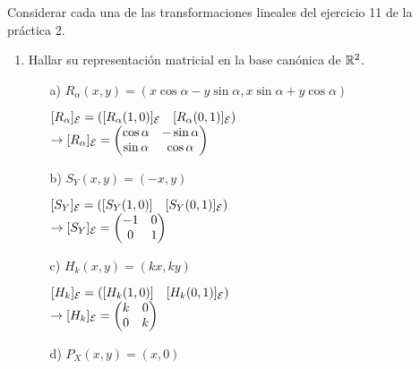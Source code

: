 \item Considerar cada una de las transformaciones lineales del ejercicio 11 de la práctica 2.
    \begin{enumerate}
        \item Hallar su representación matricial en la base canónica de $\mathbb{R}^2$.
            \begin{mdframed}[style=s]
                \begin{enumerate}
                    \item[a)] $R_\alpha(x,y)=(x\cos\alpha-y\sin\alpha,x\sin\alpha+y\cos\alpha)$
                        \begin{center}
                            $[R_\alpha]_{\mathcal{E}}=\left([R_\alpha(1,0)]_{\mathcal{E}}\quad[R_\alpha(0,1)]_{\mathcal{E}}\right)$\\
                            $\to[R_\alpha]_{\mathcal{E}}=\begin{pmatrix}
                                \cos\alpha&-\sin\alpha\\\sin\alpha&\cos\alpha
                            \end{pmatrix}$
                        \end{center}
                    \item[b)] $S_Y(x,y)=(-x,y)$
                        \begin{center}
                            $[S_Y]_{\mathcal{E}}=\left([S_Y(1,0)]\quad[S_Y(0,1)]_{\mathcal{E}}\right)$\\
                            $\to[S_Y]_{\mathcal{E}}=\begin{pmatrix}
                                -1&0\\0&1
                            \end{pmatrix}$
                        \end{center}
                    \item[c)] $H_k(x,y)=(kx,ky)$
                        \begin{center}
                            $[H_k]_{\mathcal{E}}=\left([H_k(1,0)]\quad[H_k(0,1)]_{\mathcal{E}}\right)$\\
                            $\to[H_k]_{\mathcal{E}}=\begin{pmatrix}
                                k&0\\0&k
                            \end{pmatrix}$
                        \end{center}
                    \item[d)] $P_X(x,y)=(x,0)$
                        \begin{center}

\end{center}
\end{enumerate}
\end{mdframed}
\end{enumerate}
